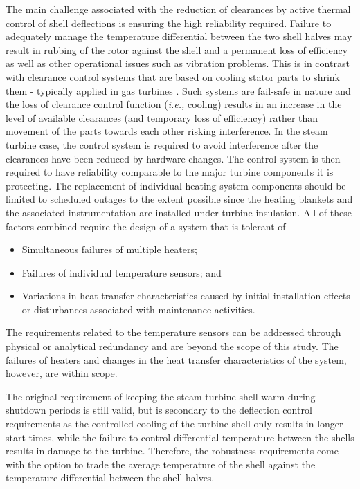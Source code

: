 \documentclass[a4paper, 10pt, conference]{ieeeconf}      %
\begin{document}
The main challenge associated with the reduction of clearances by active thermal control of shell deflections is ensuring the high reliability required. Failure to adequately manage the temperature differential between the two shell halves may result in rubbing of the rotor against the shell and a permanent loss of efficiency as well as other operational issues such as vibration problems. This is in contrast with clearance control systems that are based on cooling stator parts to shrink them - typically applied in gas turbines \cite{Korson1995}. Such systems are fail-safe in nature and the loss of clearance control function (\emph{i.e.,} cooling) results in an increase in the level of available clearances (and temporary loss of efficiency) rather than movement of the parts towards each other risking interference. In the steam turbine case, the control system is required to avoid interference after the clearances have been reduced by hardware changes.  The control system is then required to have reliability comparable to the major turbine components it is protecting. The replacement of individual heating system components should be limited to scheduled outages to the extent possible since the heating blankets and the associated instrumentation are installed under turbine insulation. All of these factors combined require the design of a system that is tolerant of

\begin{itemize}
\item Simultaneous failures of multiple heaters;
\item Failures of individual temperature sensors; and
\item Variations in heat transfer characteristics caused by initial installation effects or disturbances associated with maintenance activities.
\end{itemize}

The requirements related to the temperature sensors can be addressed through physical or analytical redundancy and are beyond the scope of this study. The failures of heaters and changes in the heat transfer characteristics of the system, however, are within scope. 

The original requirement of keeping the steam turbine shell warm during shutdown periods \cite{Spelling2012} is still valid, but is secondary to the deflection control requirements as the controlled cooling of the turbine shell only results in longer start times, while the failure to control differential temperature between the shells results in damage to the turbine. Therefore, the robustness requirements come with the option to trade the average temperature of the shell against the temperature differential between the shell halves. 
\end{document}
